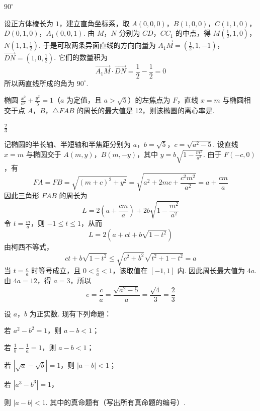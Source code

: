 \begin{answer}
\(90^{\circ}\)
\end{answer}

\begin{solution}
设正方体棱长为 \(1\)，建立直角坐标系，取
\(A(0,0,0)\)，\(B(1,0,0)\)，\(C(1,1,0)\)，\(D(0,1,0)\)，\(A_1(0,0,1)\).
由 \(M\)，\(N\) 分别为 \(CD\)，\(CC_1\) 的中点，得 \(M\left(\frac12,1,0\right)\)，\(N\left(1,1,\frac12\right)\).
于是可取两条异面直线的方向向量为 \(\overrightarrow{A_1M}=\left(\frac12,1,-1\right)\)，\(\overrightarrow{DN}=\left(1,0,\frac12\right)\).
它们的数量积为
\[
\overrightarrow{A_1M}\cdot\overrightarrow{DN}=\frac12-\frac12=0
\]
所以两直线所成的角为 \(90^{\circ}\).
\end{solution}

\begin{problem}
椭圆 \(\frac{x^2}{a^2} + \frac{y^2}{5} = 1\)（\(a\) 为定值，且 \(a > \sqrt{5}\)）的左焦点为 \(F\)，直线 \(x = m\) 与椭圆相交于点 \(A\)，\(B\)，\(\triangle FAB\) 的周长的最大值是 12，则该椭圆的离心率是\fillinblank{}.
\end{problem}

\begin{answer}
\(\frac{2}{3}\)
\end{answer}

\begin{solution}
记椭圆的半长轴、半短轴和半焦距分别为 \(a\)，\(b=\sqrt5\)，\(c=\sqrt{a^2-5}\). 设直线 \(x=m\) 与椭圆交于 \(A(m,y)\)，\(B(m,-y)\)，其中 \(y=b\sqrt{1-\frac{m^2}{a^2}}\). 由于 \(F(-c,0)\)，有
\[
FA=FB=\sqrt{(m+c)^2+y^2}
=\sqrt{a^2+2mc+\frac{c^2m^2}{a^2}}
=a+\frac{cm}{a}
\]
因此三角形 \(FAB\) 的周长为
\[
L=2\left(a+\frac{cm}{a}\right)+2b\sqrt{1-\frac{m^2}{a^2}}
\]
令 \(t=\frac ma\)，则 \(-1\leq t\leq1\)，从而
\[
L=2\left(a+ct+b\sqrt{1-t^2}\right)
\]
由柯西不等式，
\[
ct+b\sqrt{1-t^2}
\leq\sqrt{c^2+b^2}\sqrt{t^2+1-t^2}=a
\]
当 \(t=\frac{c}{a}\) 时等号成立，且 \(0<\frac{c}{a}<1\)，该取值在 \([-1,1]\) 内. 因此周长最大值为 \(4a\). 由 \(4a=12\)，得 \(a=3\)，所以
\[
e=\frac ca=\frac{\sqrt{a^2-5}}a=\frac{\sqrt4}{3}=\frac23
\]
\end{solution}

\begin{problem}
设 \(a\)，\(b\) 为正实数. 现有下列命题：
\begin{circlelist}
\item 若 \(a^2 - b^2 = 1\)，则 \(a - b < 1\)；
\item 若 \(\frac{1}{b} -\frac{1}{a} = 1\)，则 \(a - b < 1\)；
\item 若 \(|\sqrt{a} - \sqrt{b}| = 1\)，则 \(|a - b| < 1\)；
\item 若 \( |a^3 - b^3| = 1 \)，
\end{circlelist}
则 \( |a - b| < 1 \). 其中的真命题有\fillinblank{}（写出所有真命题的编号）.
\end{problem}

